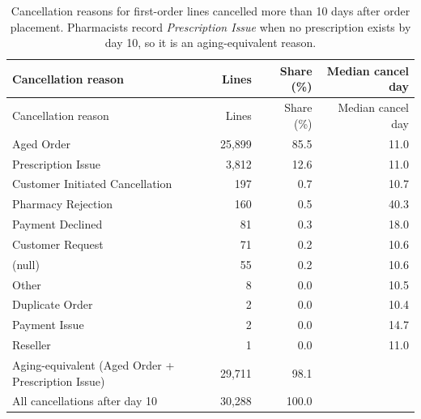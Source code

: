 \begin{longtable}{@{}lrrr@{}}
\caption{Cancellation reasons for first-order lines cancelled more than 10 days after order placement. Pharmacists record \emph{Prescription Issue} when no prescription exists by day 10, so it is an aging-equivalent reason.}
\label{tab:post-day-10-cancellation-reasons}\\
\toprule
Cancellation reason & Lines & Share (\%) & Median cancel day \\
\midrule
\endfirsthead
\toprule
Cancellation reason & Lines & Share (\%) & Median cancel day \\
\midrule
\endhead
Aged Order & 25,899 & 85.5 & 11.0 \\
Prescription Issue & 3,812 & 12.6 & 11.0 \\
Customer Initiated Cancellation & 197 & 0.7 & 10.7 \\
Pharmacy Rejection & 160 & 0.5 & 40.3 \\
Payment Declined & 81 & 0.3 & 18.0 \\
Customer Request & 71 & 0.2 & 10.6 \\
(null) & 55 & 0.2 & 10.6 \\
Other & 8 & 0.0 & 10.5 \\
Duplicate Order & 2 & 0.0 & 10.4 \\
Payment Issue & 2 & 0.0 & 14.7 \\
Reseller & 1 & 0.0 & 11.0 \\
\midrule
Aging-equivalent (Aged Order + Prescription Issue) & 29,711 & 98.1 &  \\
All cancellations after day 10 & 30,288 & 100.0 &  \\
\bottomrule
\end{longtable}
